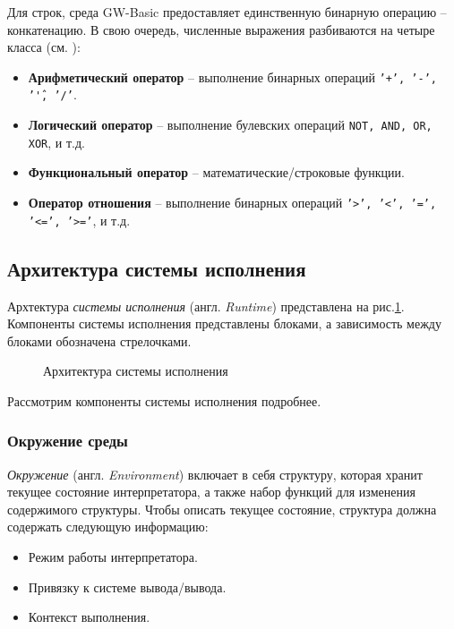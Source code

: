 \documentclass[12pt]{article}
\begin{document}
				\indent Для строк, среда GW-Basic предоставляет единственную бинарную операцию -- конкатенацию. В свою очередь, численные выражения разбиваются на четыре класса (см. \cite[стр.~46]{basicManual}):
				\begin{itemize}
					\item {\bf Арифметический оператор} -- выполнение бинарных операций {\tt '+', '-', '\^', '/'}.
					\item {\bf Логический оператор} -- выполнение булевских операций {\tt NOT, AND, OR, XOR}, и т.д. 
					\item {\bf Функциональный оператор} -- математические/строковые функции.
					\item {\bf Оператор отношения} -- выполнение бинарных операций {\tt '>', '<', '=', '<=', '>='}, и т.д.
				\end{itemize}
		\subsection{Архитектура системы исполнения}
			\label{subsec:runtimeArch}
			\hspace{\parindent} Архтектура {\it системы исполнения} (англ. {\it Runtime}) представлена на рис.\ref{fig:runtimeArch}. Компоненты системы исполнения представлены блоками, а зависимость между блоками обозначена стрелочками. 	
			\begin{figure}[h]
				\caption{Архитектура системы исполнения}
				\label{fig:runtimeArch}
			\end{figure}
			
			\indent Рассмотрим компоненты системы исполнения подробнее. 
			
			\subsubsection{Окружение среды}
			\label{subsec:environment}
			\hspace{\parindent} {\it Окружение} (англ. {\it Environment}) включает в себя структуру, которая хранит текущее состояние интерпретатора, а также набор функций для изменения содержимого структуры. Чтобы описать текущее состояние, структура должна содержать следующую информацию:
			\begin{itemize}
				\item Режим работы интерпретатора.
				\item Привязку к системе вывода/вывода.
				\item Контекст выполнения.
			\end{itemize}
			
\end{document}
